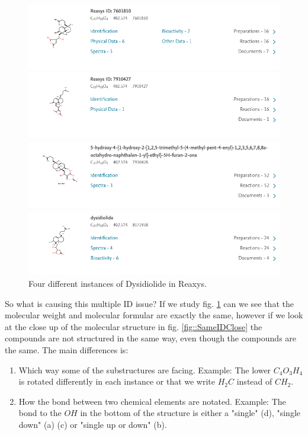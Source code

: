 \documentclass[a4paper,10pt,titlepage]{paper}
\begin{document}
\begin{figure}[H]
\hspace{-1cm}
\includegraphics[scale=0.5]{Billeder/Dysidiolide-7601810.png}

\hspace{-1cm}
\includegraphics[scale=0.5]{Billeder/Dysidiolide-7910427.png}

\hspace{-1cm}
\includegraphics[scale=0.5]{Billeder/Dysidiolide-7910428.png}

\hspace{-1cm}
\includegraphics[scale=0.5]{Billeder/Dysidiolide-8171938.png}
\caption{Four different instances of Dysidiolide in Reaxys.}
\label{fig::SameID}
\end{figure}

So what is causing this multiple ID issue? If we study fig. \ref{fig::SameID} can we see that the molecular weight and molecular formular are exactly the same, however if we look at the close up of the molecular structure in fig. \ref{fig::SameIDClose} the compounds are not structured in the same way, even though the compounds are the same. The main differences is:
\begin{enumerate}
\item
Which way some of the substructures are facing. Example: The lower $C_4O_3H_4$ is rotated differently in each instance or that we write $H_2C$ instead of $CH_2$.
\item
How the bond between two chemical elements are notated. Example: The bond to the $OH$ in the bottom of the structure is either a "single" (d), "single down" (a) (c) or "single up or down" (b).
\end{enumerate}
\end{document}

